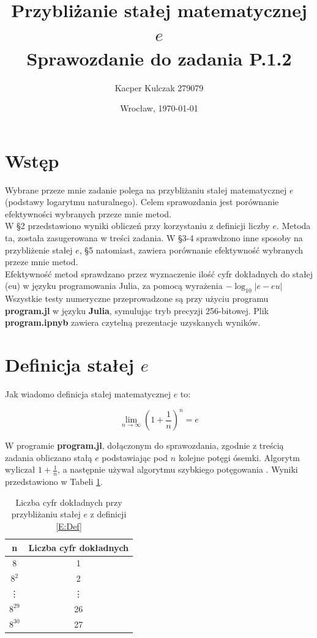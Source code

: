 \documentclass{article}
\author{Kacper Kulczak 279079}
\date{Wrocław, \today}
\title{\textbf{Przybliżanie stałej matematycznej $e$ } \\ Sprawozdanie do zadania P.1.2}
\begin{document}
\maketitle
\section{Wstęp}

Wybrane przeze mnie zadanie polega na przybliżaniu stałej matematycznej $e$ (podstawy logarytmu naturalnego). Celem sprawozdania jest porównanie efektywności wybranych przeze mnie metod.
\\ \indent
 W \S 2 przedstawiono wyniki obliczeń przy korzystaniu z definicji liczby $e$. Metoda ta, została zasugerowana w treści zadania. W \S 3-4 sprawdzono inne sposoby na przybliżenie stałej $e$,  \S 5 natomiast, zawiera porównanie efektywność wybranych przeze mnie metod.
 \\ \indent
  Efektywność metod sprawdzano przez wyznaczenie ilość cyfr dokładnych do stałej (eu) w języku programowania Julia, za pomocą wyrażenia $-\log_{10}{|e-eu|}$ 
  \\ \indent
Wszystkie testy numeryczne przeprowadzone są przy użyciu programu \textbf{program.jl} w języku \textbf{Julia}, symulując tryb precyzji 256-bitowej. Plik \textbf{program.ipnyb} zawiera czytelną prezentacje uzyskanych wyników. 

\section{Definicja stałej $e$}

Jak wiadomo definicja stałej matematycznej $e$ to:

\begin{equation}\label{E:Def}
\lim_{n\to\infty} \left(1 + \frac{1}{n} \right) ^{n} =  e
\end{equation}

W programie \textbf{program.jl}, dołączonym do sprawozdania, zgodnie z treścią zadania obliczano stałą $e$ podstawiając pod $n$ kolejne potęgi ósemki. Algorytm wyliczał $1+\frac{1}{n}$, a następnie używał algorytmu szybkiego potęgowania . Wyniki przedstawiono w Tabeli \ref{Res,def}.

\begin{table}[h]
\centering
	\begin{tabular}{|c|c|} \hline
		n & Liczba cyfr dokładnych \\ \hline
		8 &  1\\
		$8^{2}$ &  2\\
		\vdots & \vdots \\
		$8^{29}$  &  26 \\
		$8^{30}$ &  27 \\
		\hline
	\end{tabular}
	\caption{Liczba cyfr dokładnych przy przybliżaniu stałej $e$ z definicji \eqref{E:Def}}
	\label{Res,def}
\end{table}
\end{document}
